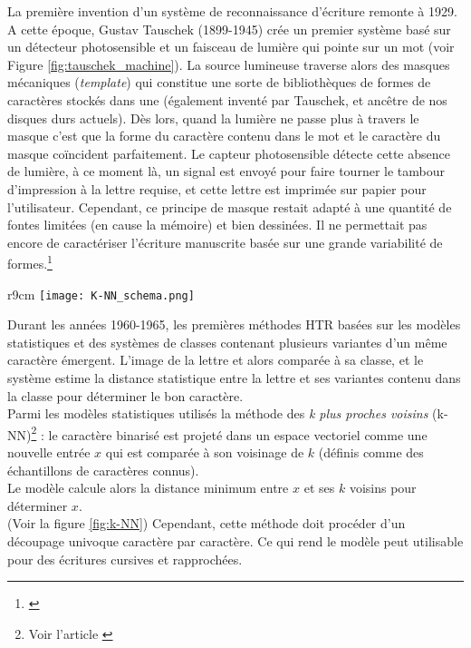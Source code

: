 La première invention d'un système de reconnaissance d'écriture remonte à 1929. A cette époque, Gustav Tauschek (1899-1945) crée un premier système basé sur un détecteur photosensible et un faisceau de lumière qui pointe sur un mot (voir Figure \ref{fig:tauschek_machine}). La source lumineuse traverse alors des masques mécaniques (\textit{template}) qui constitue une sorte de bibliothèques de formes de caractères stockés dans une  (également inventé par Tauschek, et ancêtre de nos disques durs actuels). Dès lors, quand la lumière ne passe plus à travers le masque c'est que la forme du caractère contenu dans le mot et le caractère du masque coïncident parfaitement. Le capteur photosensible détecte cette absence de lumière, à ce moment là, un signal est envoyé pour faire tourner le tambour d'impression à la lettre requise, et cette lettre est imprimée sur papier pour l'utilisateur. Cependant, ce principe de masque restait adapté à une quantité de fontes limitées (en cause la mémoire) et bien dessinées. Il ne permettait pas encore de caractériser l'écriture manuscrite basée sur une grande variabilité de formes.\footnote{\cite{ouji_segmentation_2012}}\\

\begin{wrapfigure}[20]{r}{9cm}
    \centering
    \texttt{[image: K-NN\_schema.png]}
    \caption{Illustration simplifiée de la \textit{méthode des k plus proches voisins} (k-NN) \textcopyright L. Terriel, 2020, Diagrams.net}
    \label{fig:k-NN}
\end{wrapfigure}

Durant les années 1960-1965, les premières méthodes HTR basées sur les modèles statistiques et des systèmes de classes contenant plusieurs variantes d'un même caractère émergent. L'image de la lettre et alors comparée à sa classe, et le système estime la distance statistique entre la lettre et ses variantes contenu dans la classe pour déterminer le bon caractère.\\

Parmi les modèles statistiques utilisés la méthode des \textit{k plus proches voisins} (k-NN)\footnote{Voir l'article \cite{noauthor_methode_2020}} : le caractère binarisé est projeté dans un espace vectoriel comme une nouvelle entrée $ x $ qui est comparée à son voisinage de $ k $ (définis comme des échantillons de caractères connus). \\ Le modèle calcule alors la distance minimum entre $ x $ et ses $ k $ voisins pour déterminer $ x $.\\ (Voir la figure \ref{fig:k-NN}) Cependant, cette méthode doit procéder d'un découpage univoque caractère par caractère. Ce qui rend le modèle peut utilisable pour des écritures cursives et rapprochées.\\

